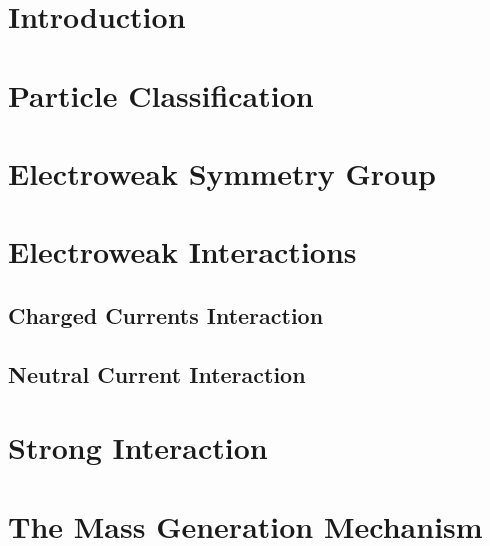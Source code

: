 \documentclass[10pt,twoside,cucitura,classica,english,openany]{toptesi}
\begin{document}
\section{Introduction}
\label{sec:introduction}



\section{Particle Classification}
\label{sec:standard-model}



\section{Electroweak Symmetry Group}
\label{sec:electro-weak-symm}



\section{Electroweak Interactions}
\label{sec:electro-weak-inter}



\subsection{Charged Currents Interaction}
\label{sec:charg-curr-inter}



\subsection{Neutral Current Interaction}
\label{sec:neutr-curr-inter}



\section{Strong Interaction}
\label{sec:strong-int}



\section{The Mass Generation Mechanism}
\label{sec:higgs-mechanism}
\end{document}
